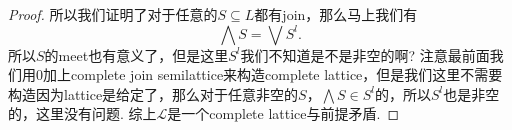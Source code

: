 \documentclass{article}
\newcommand\lattice{\mathcal{L}}
\begin{document}
\begin{proof}
所以我们证明了对于任意的$S \subseteq L$都有join，那么马上我们有
$$
\bigwedge S = \bigvee S^l.
$$
所以$S$的meet也有意义了，但是这里$S^l$我们不知道是不是非空的啊? 注意最前面我们用0加上complete join semilattice来构造complete lattice，但是我们这里不需要构造因为lattice是给定了，那么对于任意非空的$S$，$\bigwedge S \in S^l$的，所以$S^l$也是非空的，这里没有问题. 综上$\lattice$是一个complete lattice与前提矛盾.
\end{proof}
\end{document}

